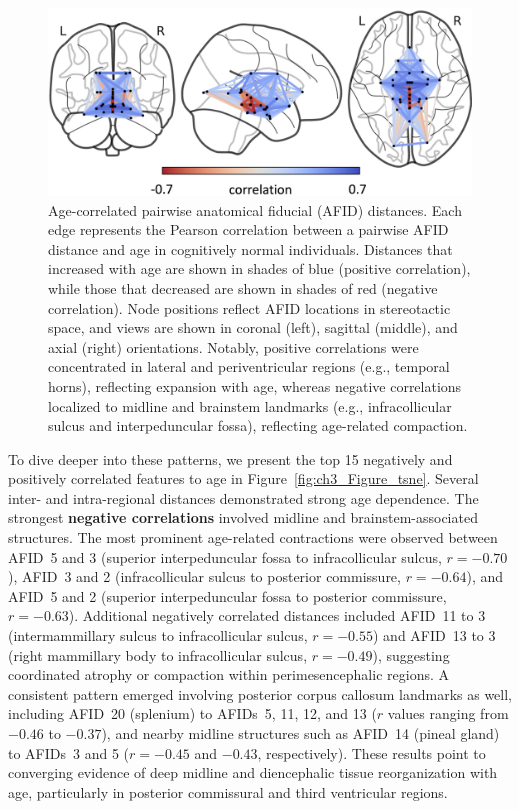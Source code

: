 \begin{figure}[hbt!]
    \centering
    \includegraphics[width=1\linewidth]{figs/ch3_Figure_alldist.png}
    \caption{Age-correlated pairwise anatomical fiducial (AFID) distances. Each edge represents the Pearson correlation between a pairwise AFID distance and age in cognitively normal individuals. Distances that increased with age are shown in shades of blue (positive correlation), while those that decreased are shown in shades of red (negative correlation). Node positions reflect AFID locations in stereotactic space, and views are shown in coronal (left), sagittal (middle), and axial (right) orientations. Notably, positive correlations were concentrated in lateral and periventricular regions (e.g., temporal horns), reflecting expansion with age, whereas negative correlations localized to midline and brainstem landmarks (e.g., infracollicular sulcus and interpeduncular fossa), reflecting age-related compaction.}
    \label{fig:ch3_Figure_alldist}
\end{figure}
To dive deeper into these patterns, we present the top 15 negatively and positively correlated features to age in Figure~\ref{fig:ch3_Figure_tsne}. Several inter- and intra-regional distances demonstrated strong age dependence. The strongest \textbf{negative correlations} involved midline and brainstem-associated structures. The most prominent age-related contractions were observed between AFID~5 and 3 (superior interpeduncular fossa to infracollicular sulcus, $r = -0.70$), AFID~3 and 2 (infracollicular sulcus to posterior commissure, $r = -0.64$), and AFID~5 and 2 (superior interpeduncular fossa to posterior commissure, $r = -0.63$). Additional negatively correlated distances included AFID~11 to 3 (intermammillary sulcus to infracollicular sulcus, $r = -0.55$) and AFID~13 to 3 (right mammillary body to infracollicular sulcus, $r = -0.49$), suggesting coordinated atrophy or compaction within perimesencephalic regions. A consistent pattern emerged involving posterior corpus callosum landmarks as well, including AFID~20 (splenium) to AFIDs~5, 11, 12, and 13 ($r$ values ranging from $-0.46$ to $-0.37$), and nearby midline structures such as AFID~14 (pineal gland) to AFIDs~3 and 5 ($r = -0.45$ and $-0.43$, respectively). These results point to converging evidence of deep midline and diencephalic tissue reorganization with age, particularly in posterior commissural and third ventricular regions.

